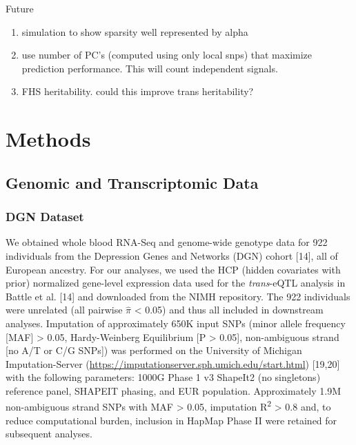 \documentclass[]{article}
\begin{document}
Future

\begin{enumerate}
\def\labelenumi{\arabic{enumi}.}
\itemsep1pt\parskip0pt
\item
  simulation to show sparsity well represented by alpha
\item
  use number of PC's (computed using only local snps) that maximize
  prediction performance. This will count independent signals.
\item
  FHS heritability. could this improve trans heritability?
\end{enumerate}

\section{Methods}\label{methods}

\subsection{Genomic and Transcriptomic
Data}\label{genomic-and-transcriptomic-data}

\subsubsection{DGN Dataset}\label{dgn-dataset}

We obtained whole blood RNA-Seq and genome-wide genotype data for 922
individuals from the Depression Genes and Networks (DGN) cohort
{[}14{]}, all of European ancestry. For our analyses, we used the HCP
(hidden covariates with prior) normalized gene-level expression data
used for the \emph{trans}-eQTL analysis in Battle et al. {[}14{]} and
downloaded from the NIMH repository. The 922 individuals were unrelated
(all pairwise \(\hat{\pi}\) \textless{} 0.05) and thus all included in
downstream analyses. Imputation of approximately 650K input SNPs (minor
allele frequency {[}MAF{]} \textgreater{} 0.05, Hardy-Weinberg
Equilibrium {[}P \textgreater{} 0.05{]}, non-ambiguous strand {[}no A/T
or C/G SNPs{]}) was performed on the University of Michigan
Imputation-Server
(\url{https://imputationserver.sph.umich.edu/start.html}) {[}19,20{]}
with the following parameters: 1000G Phase 1 v3 ShapeIt2 (no singletons)
reference panel, SHAPEIT phasing, and EUR population. Approximately 1.9M
non-ambiguous strand SNPs with MAF \textgreater{} 0.05, imputation
R\textsuperscript{2} \textgreater{} 0.8 and, to reduce computational
burden, inclusion in HapMap Phase II were retained for subsequent
analyses.
\end{document}
